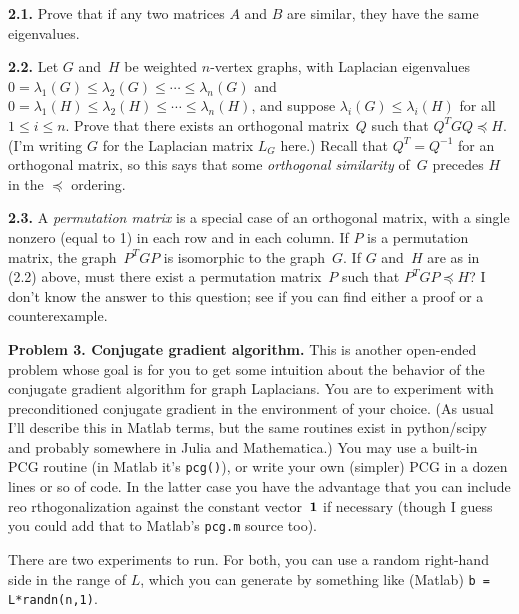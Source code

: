 \documentclass[11pt]{article}
\newcommand{\m}[1]{{\bf{#1}}}       %
\newcommand{\ones}{\m1}             %
\begin{document}
\par\medskip
{\bf 2.1.} 
Prove that if any two matrices $A$ and $B$ are similar, 
they have the same eigenvalues.

\par\medskip
{\bf 2.2.} 
Let $G$ and~$H$ be weighted $n$-vertex graphs, 
with Laplacian eigenvalues
$0=\lambda_1(G)\le\lambda_2(G)\le\cdots\le\lambda_n(G)$ and
$0=\lambda_1(H)\le\lambda_2(H)\le\cdots\le\lambda_n(H)$,
and suppose $\lambda_i(G)\le\lambda_i(H)$ for all $1\le i\le n$.
Prove that there exists an orthogonal matrix~$Q$ such that
$Q^TGQ \preceq H$. 
(I'm writing $G$ for the Laplacian matrix $L_G$ here.)
Recall that $Q^T=Q^{-1}$ for an orthogonal matrix,
so this says that some {\em orthogonal similarity} of~$G$
precedes $H$ in the $\preceq$ ordering.

\par\medskip
{\bf 2.3.} 
A {\em permutation matrix} is a special case of an orthogonal matrix, 
with a single nonzero (equal to 1) in each row and in each column.
If $P$ is a permutation matrix, 
the graph~$P^TGP$ is isomorphic to the graph~$G$.
If $G$ and~$H$ are as in (2.2) above, 
must there exist a permutation matrix~$P$ such that $P^TGP \preceq H$?
I don't know the answer to this question; 
see if you can find either a proof or a counterexample.

\par\bigskip
{\bf Problem 3. Conjugate gradient algorithm.}
This is another open-ended problem whose goal is for you to get some
intuition about the behavior of the conjugate gradient algorithm for graph 
Laplacians.
You are to experiment with preconditioned conjugate gradient
in the environment of your choice.
(As usual I'll describe this in Matlab terms, but the same routines
exist in python/scipy and probably somewhere in Julia and Mathematica.)
You may use a built-in PCG routine (in Matlab it's {\tt pcg()}),
or write your own (simpler) PCG in a dozen lines or so of code.
In the latter case you have the advantage that you can include reo
rthogonalization against the constant vector~$\ones$ if necessary 
(though I guess you could add that to Matlab's {\tt pcg.m} source too).

There are two experiments to run. 
For both, you can use a random right-hand side in the range of $L$,
which you can generate by something like (Matlab) {\tt b = L*randn(n,1)}.
\end{document}
